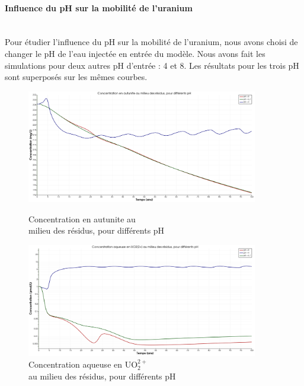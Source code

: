 \documentclass{article}
\begin{document}
\paragraph{Influence du pH sur la mobilité de l'uranium \\ \\}
Pour étudier l’influence du pH sur la mobilité de l’uranium, nous avons choisi de changer le pH de l’eau injectée en entrée du modèle. Nous avons fait les simulations pour deux autres pH d’entrée : 4 et 8. Les résultats pour les trois pH sont superposés sur les mêmes courbes.

\begin{figure}[H]
    \centering
    \begin{minipage}{0.5\textwidth}
        \centering
        \includegraphics[width=0.9\textwidth]{III_B_2_9.png} 
        \caption{Concentration en autunite au \\milieu des résidus, pour différents pH}
        \label{fig:autunite_residus_comparaison}
    \end{minipage}\hfill
    \begin{minipage}{0.5\textwidth}
        \centering
        \includegraphics[width=0.9\textwidth]{III_B_2_10.png} 
        \caption{Concentration aqueuse en UO$_2^{2+}$ \\au milieu des résidus, pour différents pH}
        \label{fig:UO2_residus_comparaison}
    \end{minipage}
\end{figure}
\end{document}
